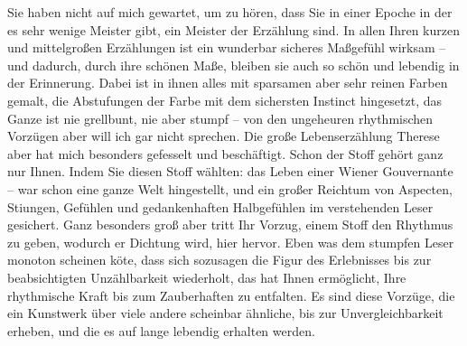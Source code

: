 \pstart
           Sie haben nicht auf mich gewartet, um zu hören, dass Sie in einer Epoche in der es
               sehr wenige Meister gibt, ein Meister der Erzählung sind. In allen Ihren kurzen und
               mittelgroßen Erzählungen ist ein wunderbar sicheres Maßgefühl wirksam – und dadurch,
               durch ihre schönen Maße, bleiben sie auch so schön und lebendig in der Erinnerung.
                  {\pb}Dabei ist in ihnen alles mit
               sparsamen aber sehr reinen Farben gemalt, die Abstufungen der Farbe mit dem
               sichersten Instinct hingesetzt, das Ganze ist nie grellbunt, nie aber stumpf – von
               den ungeheuren rhythmischen Vorzügen aber will ich gar nicht sprechen. Die große
               Lebenserzählung Therese aber hat mich besonders
               gefesselt und beschäftigt. Schon der Stoff gehört ganz nur Ihnen. Indem Sie diesen
               Stoff wählten: das Leben einer Wiener Gouvernante
               – war schon eine ganze Welt hingestellt, und ein großer Reichtum von Aspecten, Sti{\geminationm}ungen, Gefühlen und gedankenhaften Halbgefühlen im
               verstehenden Leser gesichert. Ganz besonders groß aber tritt Ihr Vorzug, einem Stoff
               den Rhythmus zu geben, wodurch er Dichtung wird, hier hervor. Eben was dem stumpfen
               Leser monoton scheinen kö{\geminationn}te, dass sich sozusagen die
               Figur des Erlebnisses bis zur beabsichtigten Unzählbarkeit wiederholt, das hat Ihnen
               ermöglicht, Ihre rhythmische Kraft bis zum Zauberhaften zu entfalten. Es sind diese
               Vorzüge, die ein Kunstwerk über viele andere scheinbar ähnliche, bis zur
               Unvergleichbarkeit erheben, und die {\pb}es auf lange lebendig erhalten
               werden.\pend
           
